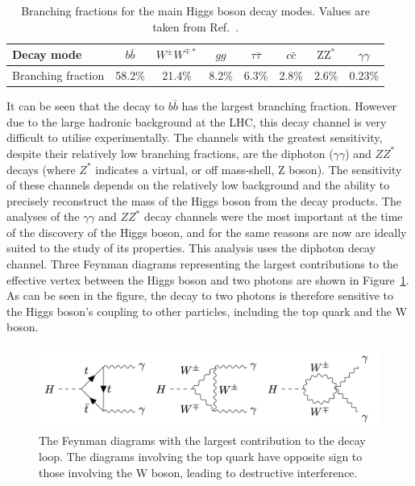 \begin{table}
  \centering
  \begin{tabular}{ l | c c c c c c c }
      \hline
      Decay mode & $b\bar{b}$ & $W^{\pm}W^{\mp*}$ & $gg$ & $\tau\bar{\tau}$ & $c\bar{c}$ & $\mathrm{ZZ}^{*}$ & $\gamma\gamma$ \\
      \hline
      Branching fraction & 58.2\% & 21.4\% & 8.2\% & 6.3\% & 2.8\% & 2.6\% & 0.23\% \\
      \hline
  \end{tabular}%
  \caption{
  Branching fractions for the main Higgs boson decay modes. 
  Values are taken from Ref.~\cite{YR4}.
  }
  \label{tab:theory_decay}
\end{table}

It can be seen that the decay to $b\bar{b}$ has the largest branching fraction.
However due to the large hadronic background at the LHC, 
this decay channel is very difficult to utilise experimentally.
The channels with the greatest sensitivity, despite their relatively low branching fractions, 
are the diphoton ($\gamma\gamma$) and $ZZ^{*}$ decays 
(where $Z^{*}$ indicates a virtual, or off mass-shell, Z boson).
The sensitivity of these channels depends on the relatively low background 
and the ability to precisely reconstruct the mass of the Higgs boson from the decay products.
The analyses of the $\gamma\gamma$ and $ZZ^{*}$ decay channels were the most important 
at the time of the discovery of the Higgs boson, 
and for the same reasons are now are ideally suited to the study of its properties.
This analysis uses the diphoton decay channel.
Three Feynman diagrams representing the largest contributions to the effective vertex 
between the Higgs boson and two photons are shown in Figure~\ref{fig:theory_FeynDecay}.
As can be seen in the figure, 
the decay to two photons is therefore sensitive to the Higgs boson's coupling to other particles, 
including the top quark and the W boson.

\begin{figure}[hptb]
  \centering
  \includegraphics[width=\textwidth]{Figures/Theory/FeynDecay.png}
  \caption[Feyman diagrams contributing to the \Hgg decay loop.]
  {
    The Feynman diagrams with the largest contribution to the \Hgg decay loop.
    The diagrams involving the top quark have opposite sign to those involving the W boson, 
    leading to destructive interference.
  }
  \label{fig:theory_FeynDecay}
\end{figure}


